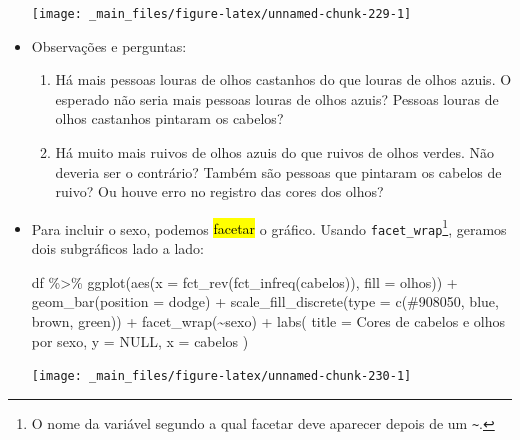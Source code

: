 \documentclass[
  11pt]{report}
\newenvironment{Shaded}{\begin{snugshade}}{\end{snugshade}}
\newcommand{\AttributeTok}[1]{\textcolor[rgb]{0.77,0.63,0.00}{#1}}
\newcommand{\ConstantTok}[1]{\textcolor[rgb]{0.00,0.00,0.00}{#1}}
\newcommand{\FunctionTok}[1]{\textcolor[rgb]{0.00,0.00,0.00}{#1}}
\newcommand{\NormalTok}[1]{#1}
\newcommand{\SpecialCharTok}[1]{\textcolor[rgb]{0.00,0.00,0.00}{#1}}
\newcommand{\StringTok}[1]{\textcolor[rgb]{0.31,0.60,0.02}{#1}}
\renewenvironment{Shaded}{
    \begin{mdframed}[%
      roundcorner=2pt,%
      innerleftmargin=5pt,%
      innerrightmargin=5pt,%
      topline=true,%
      leftline=true,%
      rightline=true,%
      bottomline=true,%
      linewidth=0.5pt,%
      linecolor=black!20,%
      backgroundcolor=black!2,%
      skipabove=2ex,%
      skipbelow=2.5ex%
    ]%
  }
  {
    \end{mdframed}
  }
\begin{document}
\begin{itemize}
  \begin{center}\texttt{[image: \_main\_files/figure-latex/unnamed-chunk-229-1]} \end{center}
\item
  Observações e perguntas:

  \begin{enumerate}
  \def\labelenumi{\arabic{enumi}.}
  \item
    Há mais pessoas louras de olhos castanhos do que louras de olhos azuis. O esperado não seria mais pessoas louras de olhos azuis? Pessoas louras de olhos castanhos pintaram os cabelos?
  \item
    Há muito mais ruivos de olhos azuis do que ruivos de olhos verdes. Não deveria ser o contrário? Também são pessoas que pintaram os cabelos de ruivo? Ou houve erro no registro das cores dos olhos?
  \end{enumerate}
\item
  Para incluir o sexo, podemos {\hl{facetar}} o gráfico. Usando \texttt{facet\_wrap}\footnote{O nome da variável segundo a qual facetar deve aparecer depois de um \texttt{\textasciitilde{}}.}, geramos dois subgráficos lado a lado:

\begin{Shaded}
\begin{Highlighting}[]
\NormalTok{df }\SpecialCharTok{\%\textgreater{}\%} 
  \FunctionTok{ggplot}\NormalTok{(}\FunctionTok{aes}\NormalTok{(}\AttributeTok{x =} \FunctionTok{fct\_rev}\NormalTok{(}\FunctionTok{fct\_infreq}\NormalTok{(cabelos)), }\AttributeTok{fill =}\NormalTok{ olhos)) }\SpecialCharTok{+}
    \FunctionTok{geom\_bar}\NormalTok{(}\AttributeTok{position =} \StringTok{\textquotesingle{}dodge\textquotesingle{}}\NormalTok{) }\SpecialCharTok{+}
    \FunctionTok{scale\_fill\_discrete}\NormalTok{(}\AttributeTok{type =} \FunctionTok{c}\NormalTok{(}\StringTok{\textquotesingle{}\#908050\textquotesingle{}}\NormalTok{, }\StringTok{\textquotesingle{}blue\textquotesingle{}}\NormalTok{, }\StringTok{\textquotesingle{}brown\textquotesingle{}}\NormalTok{, }\StringTok{\textquotesingle{}green\textquotesingle{}}\NormalTok{)) }\SpecialCharTok{+}
    \FunctionTok{facet\_wrap}\NormalTok{(}\SpecialCharTok{\textasciitilde{}}\NormalTok{sexo) }\SpecialCharTok{+}
    \FunctionTok{labs}\NormalTok{(}
      \AttributeTok{title =} \StringTok{\textquotesingle{}Cores de cabelos e olhos por sexo\textquotesingle{}}\NormalTok{,}
      \AttributeTok{y =} \ConstantTok{NULL}\NormalTok{,}
      \AttributeTok{x =} \StringTok{\textquotesingle{}cabelos\textquotesingle{}}
\NormalTok{    )}
\end{Highlighting}
\end{Shaded}

  \begin{center}\texttt{[image: \_main\_files/figure-latex/unnamed-chunk-230-1]} \end{center}
\end{itemize}
\end{document}

